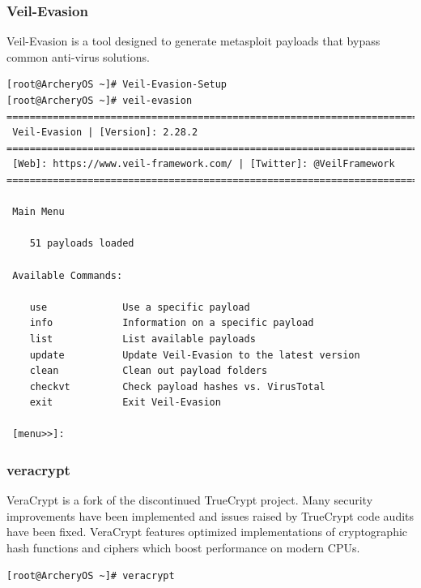 \documentclass{article}
\begin{document}
\subsubsection{Veil-Evasion}
Veil-Evasion is a tool designed to generate metasploit payloads that bypass common anti-virus solutions.
\begin{lstlisting}
[root@ArcheryOS ~]# Veil-Evasion-Setup
[root@ArcheryOS ~]# veil-evasion
=========================================================================
 Veil-Evasion | [Version]: 2.28.2
=========================================================================
 [Web]: https://www.veil-framework.com/ | [Twitter]: @VeilFramework
=========================================================================

 Main Menu

	51 payloads loaded

 Available Commands:

	use         	Use a specific payload
	info        	Information on a specific payload
	list        	List available payloads
	update      	Update Veil-Evasion to the latest version
	clean       	Clean out payload folders
	checkvt     	Check payload hashes vs. VirusTotal
	exit        	Exit Veil-Evasion

 [menu>>]:
\end{lstlisting}


\subsubsection{veracrypt}
VeraCrypt is a fork of the discontinued TrueCrypt project. Many security improvements have been implemented and issues raised by TrueCrypt code audits have been fixed. VeraCrypt features optimized implementations of cryptographic hash functions and ciphers which boost performance on modern CPUs.
\begin{lstlisting}
[root@ArcheryOS ~]# veracrypt
\end{lstlisting}
\end{document}
